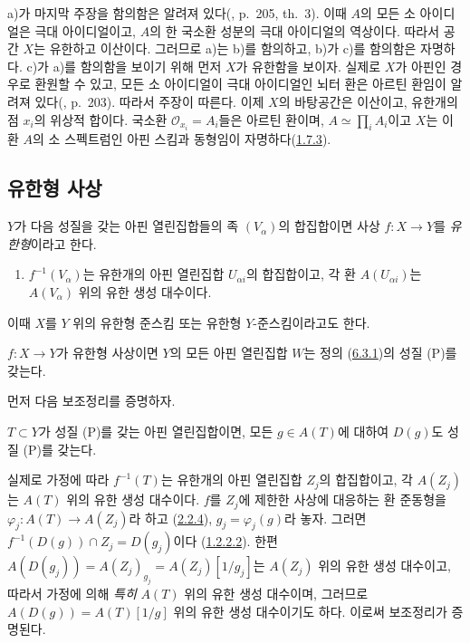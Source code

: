 a)가 마지막 주장을 함의함은 알려져 있다(\cite{I-13}, p.~205,
th.~3). 이때 $A$의 모든 소 아이디얼은 극대 아이디얼이고, $A$의 한
국소환 성분의 극대 아이디얼의 역상이다. 따라서 공간 $X$는 유한하고
이산이다. 그러므로 a)는 b)를 함의하고, b)가 c)를 함의함은 자명하다.
c)가 a)를 함의함을 보이기 위해 먼저 $X$가 유한함을 보이자. 실제로
$X$가 아핀인 경우로 환원할 수 있고, 모든 소 아이디얼이 극대
아이디얼인 뇌터 환은 아르틴 환임이 알려져 있다(\cite{I-13}, p.~203).
따라서 주장이 따른다. 이제 $X$의 바탕공간은 이산이고, 유한개의 점
$x_i$의 위상적 합이다. 국소환 $\mathscr{O}_{x_i}=A_i$들은 아르틴
환이며, $A\simeq\prod_i A_i$이고 $X$는 이 환 $A$의 소 스펙트럼인
아핀 스킴과 동형임이 자명하다(\hyperref[I.1.7.3-ko]{1.7.3}).

\subsection{유한형 사상}
\label{subsection:I.6.3-ko}

\begin{definition}[6.3.1]
\label{I.6.3.1-ko}
$Y$가 다음 성질을 갖는 아핀 열린집합들의 족 $(V_\alpha)$의 합집합이면
사상 $f:X\to Y$를 \emph{유한형}이라고 한다.
\begin{enumerate}
  \item[(P)] $f^{-1}(V_\alpha)$는 유한개의 아핀 열린집합
    $U_{\alpha i}$의 합집합이고, 각 환 $A(U_{\alpha i})$는
    $A(V_\alpha)$ 위의 유한 생성 대수이다.
\end{enumerate}
이때 $X$를 $Y$ 위의 유한형 준스킴 또는 유한형 $Y$-준스킴이라고도
한다.
\end{definition}

\begin{proposition}[6.3.2]
\label{I.6.3.2-ko}
$f:X\to Y$가 유한형 사상이면 $Y$의 모든 아핀 열린집합 $W$는
정의 (\hyperref[I.6.3.1-ko]{6.3.1})의 성질 (P)를 갖는다.
\end{proposition}

먼저 다음 보조정리를 증명하자.

\begin{lemma}[6.3.2.1]
\label{I.6.3.2.1-ko}
$T\subset Y$가 성질 (P)를 갖는 아핀 열린집합이면, 모든
$g\in A(T)$에 대하여 $D(g)$도 성질 (P)를 갖는다.
\end{lemma}

실제로 가정에 따라 $f^{-1}(T)$는 유한개의 아핀 열린집합 $Z_j$의
합집합이고, 각 $A(Z_j)$는 $A(T)$ 위의 유한 생성 대수이다. $f$를
$Z_j$에 제한한 사상에 대응하는 환 준동형을
$\varphi_j:A(T)\to A(Z_j)$라 하고
(\hyperref[I.2.2.4-ko]{2.2.4}), $g_j=\varphi_j(g)$라 놓자. 그러면
$f^{-1}(D(g))\cap Z_j=D(g_j)$이다
(\hyperref[I.1.2.2.2-ko]{1.2.2.2}). 한편
$A(D(g_j))=A(Z_j)_{g_j}=A(Z_j)[1/g_j]$는 $A(Z_j)$ 위의 유한 생성
대수이고, 따라서 가정에 의해 \emph{특히} $A(T)$ 위의 유한 생성
대수이며, 그러므로 $A(D(g))=A(T)[1/g]$ 위의 유한 생성 대수이기도 하다.
이로써 보조정리가 증명된다.

